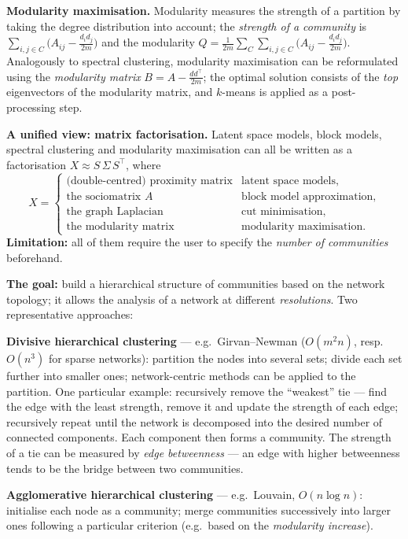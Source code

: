 \documentclass[11pt,a4paper]{article}
\theoremstyle{definition}
\providecommand{\uv}[1]{``#1''}
\begin{document}
\begin{defbox}
\textbf{Modularity maximisation.} Modularity measures the strength of a partition by taking the degree
distribution into account; the \emph{strength of a community} is
$\sum_{i,j\in C}\big(A_{ij}-\frac{d_id_j}{2m}\big)$ and the modularity
$Q=\frac{1}{2m}\sum_{C}\sum_{i,j\in C}\big(A_{ij}-\frac{d_id_j}{2m}\big)$. Analogously to spectral
clustering, modularity maximisation can be reformulated using the \emph{modularity matrix}
$B=A-\frac{dd^{\!\top}}{2m}$; the optimal solution consists of the \emph{top} eigenvectors of the
modularity matrix, and $k$-means is applied as a post-processing step.

\textbf{A unified view: matrix factorisation.} Latent space models, block models, spectral clustering
and modularity maximisation can all be written as a factorisation
$X\approx S\,\Sigma\,S^{\!\top}$, where
\[ X=\begin{cases}
\text{(double-centred) proximity matrix} & \text{latent space models},\\
\text{the sociomatrix }A & \text{block model approximation},\\
\text{the graph Laplacian} & \text{cut minimisation},\\
\text{the modularity matrix} & \text{modularity maximisation}.
\end{cases} \]
\textbf{Limitation:} all of them require the user to specify the \emph{number of communities}
beforehand.
\end{defbox}

\begin{defbox}
\textbf{The goal:} build a hierarchical structure of communities based on the network topology; it
allows the analysis of a network at different \emph{resolutions}. Two representative approaches:

\textbf{Divisive hierarchical clustering} --- e.g.\ Girvan--Newman ($O(m^2n)$, resp.\
$O(n^3)$ for sparse networks): partition the nodes into
several sets; divide each set further into smaller ones; network-centric methods can be applied to the
partition. One particular example: recursively remove the \uv{weakest} tie --- find the edge with the
least strength, remove it and update the strength of each edge; recursively repeat until the network is
decomposed into the desired number of connected components. Each component then forms a community. The
strength of a tie can be measured by \emph{edge betweenness} --- an edge with higher betweenness tends
to be the bridge between two communities.

\textbf{Agglomerative hierarchical clustering} --- e.g.\ Louvain, $O(n\log n)$: initialise each node as
a community; merge communities successively into larger ones following a particular criterion (e.g.\
based on the \emph{modularity increase}).
\end{defbox}
\end{document}
